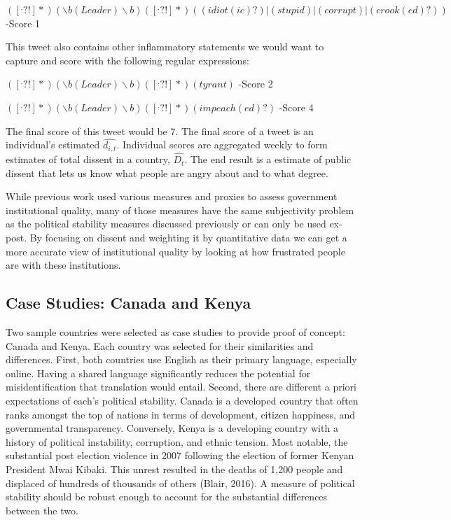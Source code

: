 \documentclass[12pt]{article}
\begin{document}
\begin{spacing}{1.5}
\begin{center}
$([^.?!]*) (\backslash b(Leader)\backslash b)([^.?!]*)((idiot(ic)?)|(stupid)|(corrupt)|(crook(ed)?))$ -Score 1
\end{center}


\noindent This tweet also contains other inflammatory statements we would want to capture and score with the following regular expressions:  

\vspace{.5 em}

\begin{center}
$([^.?!]*)(\backslash b(Leader)\backslash b)([^.?!]*)(tyrant)$ -Score 2

\vspace{.5 em}

$([^.?!]*)(\backslash b(Leader)\backslash b)([^.?!]*)(impeach(ed)?)$ -Score 4
\end{center}


\noindent The final score of this tweet would be 7. The final score of a tweet is an individual's estimated $\hat{d_{i,t}}$. Individual scores are aggregated weekly to form estimates of total dissent in a country, $\hat{D_t}$. The end result is a estimate of public dissent that lets us know what people are angry about and to what degree. 

While previous work used various measures and proxies to assess government institutional quality, many of those measures have the same subjectivity problem as the political stability measures discussed previously or can only be used ex-post. By focusing on dissent and weighting it by quantitative data we can get a more accurate view of institutional quality by looking at how frustrated people are with these institutions. 

\subsection*{Case Studies: Canada and Kenya}

Two sample countries were selected as case studies to provide proof of concept: Canada and Kenya. Each country was selected for their similarities and differences. First, both countries use English as their primary language, especially online. Having a shared language significantly reduces the potential for misidentification that translation would entail. Second, there are different a priori expectations of each’s political stability. Canada is a developed country that often ranks amongst the top of nations in terms of development, citizen happiness, and governmental transparency. Conversely, Kenya is a developing country with a history of political instability, corruption, and ethnic tension. Most notable, the substantial post election violence in 2007 following the election of former Kenyan President Mwai Kibaki. This unrest resulted in the deaths of 1,200 people and displaced of hundreds of thousands of others (Blair, 2016). A measure of political stability should be robust enough to account for the substantial differences between the two.  


\end{spacing}
\end{document}

